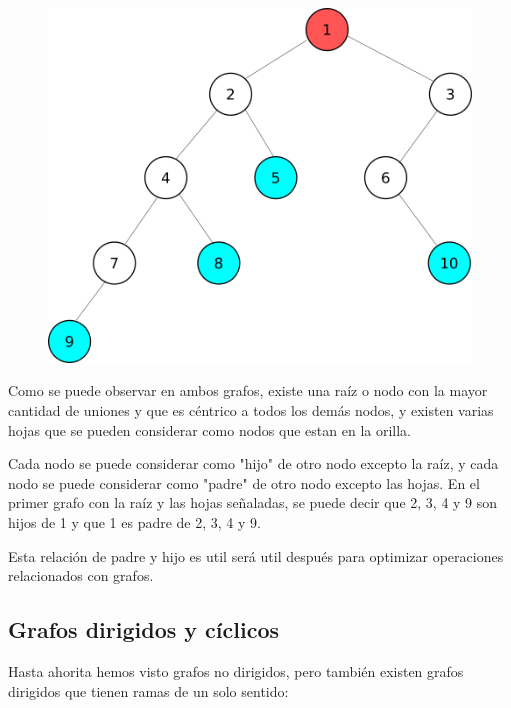 \documentclass{article}
\begin{document}
\begin{figure}[H]
    \centering
    \includegraphics[width=0.3\paperwidth]{arbolbinario}
\end{figure}

Como se puede observar en ambos grafos, existe una raíz o nodo con la mayor cantidad de uniones y que es céntrico a todos los demás nodos, y existen varias hojas que se pueden considerar como nodos que estan en la orilla.

Cada nodo se puede considerar como "hijo" de otro nodo excepto la raíz, y cada nodo se puede considerar como "padre" de otro nodo excepto las hojas. En el primer grafo con la raíz y las hojas señaladas, se puede decir que 2, 3, 4 y 9 son hijos de 1 y que 1 es padre de 2, 3, 4 y 9.

Esta relación de padre y hijo es util será util después para optimizar operaciones relacionados con grafos.

\subsection{Grafos dirigidos y cíclicos}

Hasta ahorita hemos visto grafos no dirigidos, pero también existen grafos dirigidos que tienen ramas de un solo sentido:
\end{document}
